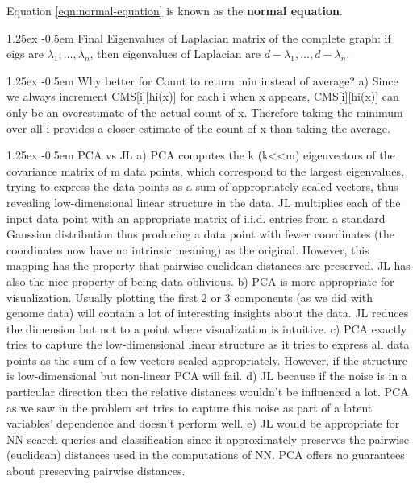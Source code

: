 \documentclass[8pt]{article}
\makeatletter
\newlength{\norm}
\newlength{\nrm}
\renewcommand{\paragraph}{%
  \@startsection{paragraph}{4}%
  {\z@}{1.25ex \@plus 2pt \@minus 2pt}{-0.5em}%
  {\fontsize{\f@size}{\nrm}\normalfont\bfseries}%
}
\makeatother
\begin{document}
Equation \ref{eqn:normal-equation} is known as the \textbf{normal equation}.

\paragraph{Final} Eigenvalues of Laplacian matrix of the complete graph: if eigs are $\lambda_1, \dots, \lambda_n$, then eigenvalues of Laplacian are $d - \lambda_1, \dots, d - \lambda_n$.

\paragraph{Why better for Count to return min instead of average?} a) Since we always increment CMS[i][hi(x)] for each i when x appears, CMS[i][hi(x)] can only be an overestimate of the actual count of x. Therefore taking the minimum over all i provides a closer estimate of the count of x than taking the average.

\paragraph{PCA vs JL}
a) PCA computes the k (k<<m) eigenvectors of the covariance matrix of m data points, which correspond to the largest eigenvalues, trying to express the data points as a sum of appropriately scaled vectors, thus revealing low-dimensional linear structure in the data. JL multiplies each of the input data point with an appropriate matrix of i.i.d. entries from a standard Gaussian distribution thus producing a data point with fewer coordinates (the coordinates now have no intrinsic meaning) as the original. However, this mapping has the property that pairwise euclidean distances are preserved. JL has also the nice property of being data-oblivious.
b) PCA is more appropriate for visualization. Usually plotting the first 2 or 3 components (as we did with genome data) will contain a lot of interesting insights about the data. JL reduces the dimension but not to a point where visualization is intuitive.
c) PCA exactly tries to capture the low-dimensional linear structure as it tries to express all data points as the sum of a few vectors scaled appropriately. However, if the structure is low-dimensional but non-linear PCA will fail.
d) JL because if the noise is in a particular direction then the relative distances wouldn’t be influenced a lot. PCA as we saw in the problem set tries to capture this noise as part of a latent variables’ dependence and doesn’t perform well.
e) JL would be appropriate for NN search queries and classification since it approximately preserves the pairwise (euclidean) distances used in the computations of NN. PCA offers no guarantees about preserving pairwise distances.
\end{document}
